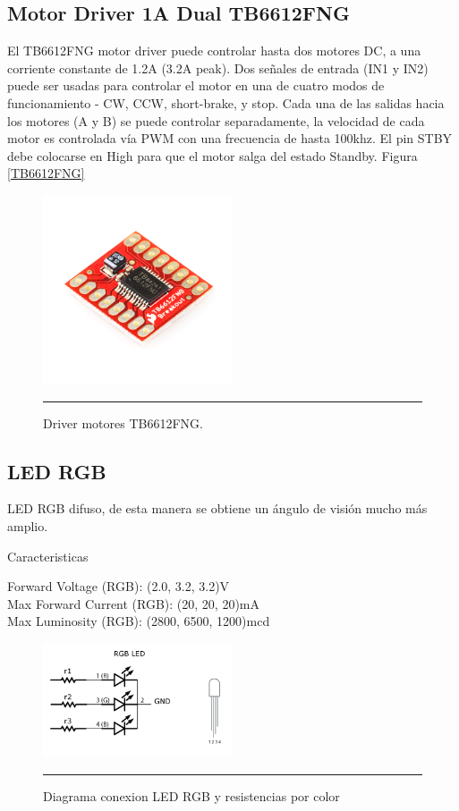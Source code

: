 \subsection{Motor Driver 1A Dual TB6612FNG}
El TB6612FNG motor driver puede controlar hasta dos motores DC, a una corriente constante de 1.2A (3.2A peak). Dos señales de entrada (IN1 y IN2) puede ser usadas para controlar el motor en una de cuatro modos de funcionamiento - CW, CCW, short-brake, y stop. Cada una de las salidas hacia los motores (A y B) se puede controlar separadamente, la velocidad de cada motor es controlada vía PWM con una frecuencia de hasta 100khz. El pin STBY debe colocarse en High para que el motor salga del estado Standby. Figura \ref{TB6612FNG}

\begin{figure}[htbp]
	\centering
		\includegraphics[width=0.5\textwidth]{./Figures/MODI/TB6612FNG.jpg}
		\rule{35em}{0.5pt}
	\caption[TB6612FNG]{Driver motores TB6612FNG.}
	\label{fig:TB6612FNG}
\end{figure}


\subsection{LED RGB}

LED RGB difuso, de esta manera se obtiene un ángulo de visión mucho más amplio.

Caracteristicas

Forward Voltage (RGB): (2.0, 3.2, 3.2)V \\
Max Forward Current (RGB): (20, 20, 20)mA \\
Max Luminosity (RGB): (2800, 6500, 1200)mcd

\begin{figure}[htbp]
	\centering
		\includegraphics[width=0.5\textwidth]{./Figures/MODI/RGBLED.png}
		\rule{35em}{0.5pt}
	\caption[ledRGB]{Diagrama conexion LED RGB y resistencias por color}
	\label{fig:ledRGB}
\end{figure}

